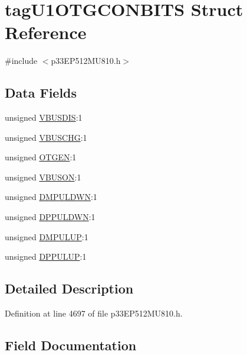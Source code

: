 \hypertarget{structtag_u1_o_t_g_c_o_n_b_i_t_s}{}\section{tag\+U1\+O\+T\+G\+C\+O\+N\+B\+I\+TS Struct Reference}
\label{structtag_u1_o_t_g_c_o_n_b_i_t_s}


{\ttfamily \#include $<$p33\+E\+P512\+M\+U810.\+h$>$}

\subsection*{Data Fields}
\begin{DoxyCompactItemize}
\item 
unsigned \hyperlink{structtag_u1_o_t_g_c_o_n_b_i_t_s_adb6d1a8bdbca05aebca7c5dab0882f24}{V\+B\+U\+S\+D\+IS}\+:1
\item 
unsigned \hyperlink{structtag_u1_o_t_g_c_o_n_b_i_t_s_a1251b6244fa2af7c170fde46a3252481}{V\+B\+U\+S\+C\+HG}\+:1
\item 
unsigned \hyperlink{structtag_u1_o_t_g_c_o_n_b_i_t_s_a70f70b81be78a6e94c071553d812360d}{O\+T\+G\+EN}\+:1
\item 
unsigned \hyperlink{structtag_u1_o_t_g_c_o_n_b_i_t_s_a78c21435351b775598cfef420f0292fd}{V\+B\+U\+S\+ON}\+:1
\item 
unsigned \hyperlink{structtag_u1_o_t_g_c_o_n_b_i_t_s_a2d1784782c7b8f765b0ffd389cf79fc7}{D\+M\+P\+U\+L\+D\+WN}\+:1
\item 
unsigned \hyperlink{structtag_u1_o_t_g_c_o_n_b_i_t_s_a593609d822b09f404a4ba19f8ec115c6}{D\+P\+P\+U\+L\+D\+WN}\+:1
\item 
unsigned \hyperlink{structtag_u1_o_t_g_c_o_n_b_i_t_s_ae17b3947af30da14da67b324e1b96a37}{D\+M\+P\+U\+L\+UP}\+:1
\item 
unsigned \hyperlink{structtag_u1_o_t_g_c_o_n_b_i_t_s_a510b5b083bf98ec94ef7709d0cebcc6a}{D\+P\+P\+U\+L\+UP}\+:1
\end{DoxyCompactItemize}


\subsection{Detailed Description}


Definition at line 4697 of file p33\+E\+P512\+M\+U810.\+h.



\subsection{Field Documentation}
\mbox{\label{structtag_u1_o_t_g_c_o_n_b_i_t_s_a2d1784782c7b8f765b0ffd389cf79fc7}} 
